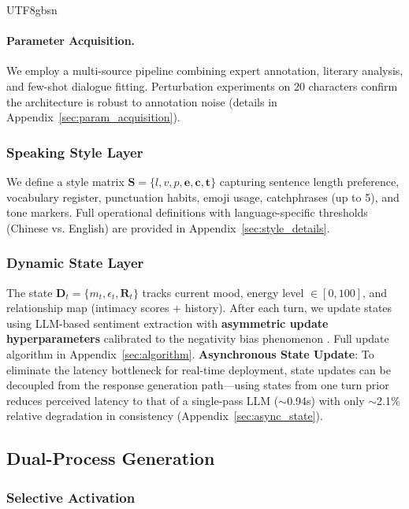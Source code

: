 \documentclass[11pt]{article}
\begin{document}
\begin{CJK*}{UTF8}{gbsn}
\paragraph{Parameter Acquisition.} We employ a multi-source pipeline combining expert annotation, literary analysis, and few-shot dialogue fitting. Perturbation experiments on 20 characters confirm the architecture is robust to annotation noise (details in Appendix~\ref{sec:param_acquisition}).

\subsubsection{Speaking Style Layer}

We define a style matrix $\mathbf{S} = \{l, v, p, \mathbf{e}, \mathbf{c}, \mathbf{t}\}$ capturing sentence length preference, vocabulary register, punctuation habits, emoji usage, catchphrases (up to 5), and tone markers. Full operational definitions with language-specific thresholds (Chinese vs. English) are provided in Appendix~\ref{sec:style_details}.

\subsubsection{Dynamic State Layer}

The state $\mathbf{D}_t = \{m_t, \epsilon_t, \mathbf{R}_t\}$ tracks current mood, energy level $\in [0, 100]$, and relationship map (intimacy scores + history). After each turn, we update states using LLM-based sentiment extraction with \textbf{asymmetric update hyperparameters} calibrated to the negativity bias phenomenon \citep{baumeister2001bad}. Full update algorithm in Appendix~\ref{sec:algorithm}. \textbf{Asynchronous State Update}: To eliminate the latency bottleneck for real-time deployment, state updates can be decoupled from the response generation path---using states from one turn prior reduces perceived latency to that of a single-pass LLM ($\sim$0.94s) with only $\sim$2.1\% relative degradation in consistency (Appendix~\ref{sec:async_state}).

\subsection{Dual-Process Generation}

\subsubsection{Selective Activation}
\label{sec:trigger}


\end{CJK*}
\end{document}
